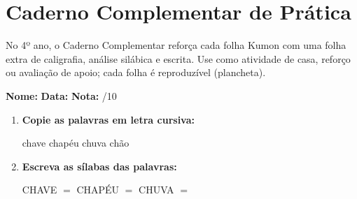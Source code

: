
\chapter{Caderno Complementar de Prática}

No 4º ano, o Caderno Complementar reforça cada folha Kumon com uma folha extra de caligrafia, análise silábica e escrita. Use como atividade de casa, reforço ou avaliação de apoio; cada folha é reproduzível (plancheta).



\begin{exercicio}



\noindent\textbf{Nome:} \underline{\hspace{3.2cm}} \quad \textbf{Data:} \underline{\hspace{1.6cm}} \quad \textbf{Nota:} \underline{\hspace{0.9cm}}/10


\begin{enumerate}

  \item \textbf{Copie as palavras em letra cursiva:}
  \begin{center}
  chave \quad chapéu \quad chuva \quad chão
  \end{center}
  \begin{center}
  \underline{\hspace{2.4cm}} \quad \underline{\hspace{2.4cm}} \quad \underline{\hspace{2.4cm}} \quad \underline{\hspace{2.4cm}}
  \end{center}

  \item \textbf{Escreva as sílabas das palavras:}
  \begin{center}
  CHAVE $=$ \underline{\hspace{1.5cm}} \underline{\hspace{1.5cm}} \quad CHAPÉU $=$ \underline{\hspace{1.5cm}} \underline{\hspace{1.5cm}} \quad CHUVA $=$ \underline{\hspace{1.5cm}} \underline{\hspace{1.5cm}}
  \end{center}


\end{enumerate}
\end{exercicio}
